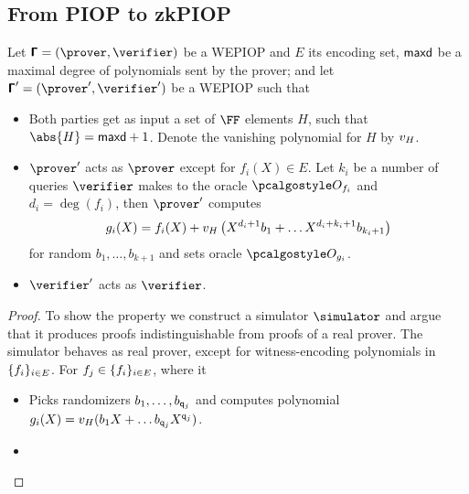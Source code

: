 \documentclass[runningheads,11pt]{llncs}
\begin{document}
\subsection{From PIOP to zkPIOP}

\begin{theorem}
  Let $\PIOP = (\prover, \verifier)$ be a WEPIOP and $E$ its encoding set,
  $\mathsf{maxd}$ be a maximal degree of polynomials sent by the prover; and
  let $\PIOP' = (\prover', \verifier')$ be a WEPIOP such that
  \begin{itemize}
  \item Both parties get as input a set of $\FF$ elements $H$, such that
    $\abs{H} = \maxdeg + 1$. Denote the vanishing polynomial for $H$ by $v_{H}$.
  \item $\prover'$ acts as $\prover$ except for $f_i(X) \in E$. Let $k_i$ be a
    number of queries $\verifier$ makes to the oracle $\oracleo_{f_i}$ and
    $d_i = \deg(f_i)$, then $\prover'$ computes
      \[
        g_i(X) = f_i(X) + v_{H}\left(X^{d_i + 1} b_1 + \ldots
        X^{d_i + k_i + 1} b_{k_i + 1}\right)
      \]
      for random $b_1, \ldots, b_{k + 1}$ and sets oracle $\oracleo_{g_i}$.
    \item $\verifier'$ acts as $\verifier$. 
  \end{itemize}
\end{theorem}
\begin{proof}


   To show the property we construct a simulator
  $\simulator$ and argue that it produces proofs indistinguishable from proofs
  of a real prover. The simulator behaves as real prover, except for
  witness-encoding polynomials in $\{f_i\}_{i \in E}$. For
  $f_j \in \{f_i\}_{i \in E}$, where it
  \begin{itemize}
  \item Picks randomizers $b_1, \ldots, b_{\mathsf{q}_j}$ and computes polynomial
    $g_i(X) =  v_{H}(b_1 X + \ldots b_{\mathsf{q}_j} X^{\mathsf{q}_j})$. 
  \item {}
  \end{itemize}
  
\end{proof}
\end{document}

